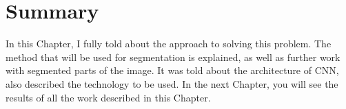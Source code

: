 \vspace{-0.3cm}


\section{Summary}\label{sec:4.4}
\vspace{-0.5cm}
\noindent In this Chapter, I fully told about the approach to solving this problem. The method that will be used for segmentation is explained, as well as further work with segmented parts of the image. It was told about the architecture of CNN, also described the technology to be used. In the next Chapter, you will see the results of all the work described in this Chapter.

\vspace{-0.3cm}



